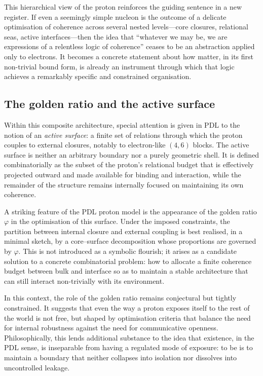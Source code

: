 \documentclass[11pt,a4paper]{article}
\theoremstyle{definition}
\begin{document}
This hierarchical view of the proton reinforces the guiding sentence in a new register. If even a seemingly simple nucleon is the outcome of a delicate optimisation of coherence across several nested levels---core closures, relational seas, active interfaces---then the idea that ``whatever we may be, we are expressions of a relentless logic of coherence'' ceases to be an abstraction applied only to electrons. It becomes a concrete statement about how matter, in its first non-trivial bound form, is already an instrument through which that logic achieves a remarkably specific and constrained organisation.\cite{Laubscher_Existence_PulsatingClosure_2026}

\subsection{The golden ratio and the active surface}

Within this composite architecture, special attention is given in PDL to the notion of an \emph{active surface}: a finite set of relations through which the proton couples to external closures, notably to electron-like \((4,6)\) blocks.\cite{Laubscher_GoldenRatio_Sketch_2024,Laubscher_Born_Golden_v2_2024} The active surface is neither an arbitrary boundary nor a purely geometric shell. It is defined combinatorially as the subset of the proton’s relational budget that is effectively projected outward and made available for binding and interaction, while the remainder of the structure remains internally focused on maintaining its own coherence.

A striking feature of the PDL proton model is the appearance of the golden ratio \(\varphi\) in the optimisation of this surface. Under the imposed constraints, the partition between internal closure and external coupling is best realised, in a minimal sketch, by a core–surface decomposition whose proportions are governed by \(\varphi\).\cite{Laubscher_GoldenRatio_Sketch_2024,Laubscher_Alpha_v2_2024} This is not introduced as a symbolic flourish; it arises as a candidate solution to a concrete combinatorial problem: how to allocate a finite coherence budget between bulk and interface so as to maintain a stable architecture that can still interact non-trivially with its environment.

In this context, the role of the golden ratio remains conjectural but tightly constrained. It suggests that even the way a proton exposes itself to the rest of the world is not free, but shaped by optimisation criteria that balance the need for internal robustness against the need for communicative openness.\cite{Laubscher_GoldenRatio_Sketch_2024,Laubscher_Born_Golden_v2_2024} Philosophically, this lends additional substance to the idea that existence, in the PDL sense, is inseparable from having a regulated mode of exposure: to be is to maintain a boundary that neither collapses into isolation nor dissolves into uncontrolled leakage.
\end{document}
